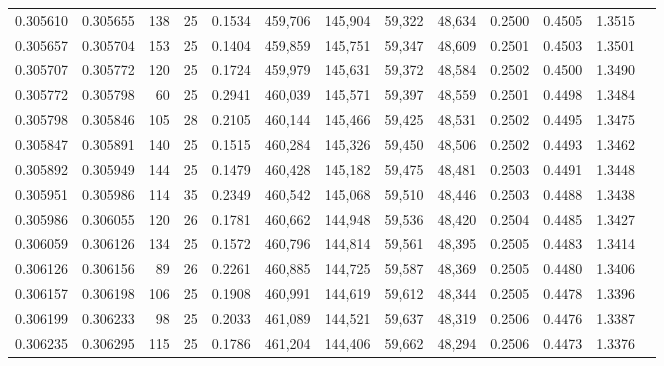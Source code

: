 \begin{tabular}{rrrrrrrrrrrrr}
0.305610 & 0.305655 &   138 &  25 &                                     0.1534 & 459,706 & 145,904 &  59,322 &  48,634 & 0.2500 & 0.4505 & 1.3515 \\
0.305657 & 0.305704 &   153 &  25 &                                     0.1404 & 459,859 & 145,751 &  59,347 &  48,609 & 0.2501 & 0.4503 & 1.3501 \\
0.305707 & 0.305772 &   120 &  25 &                                     0.1724 & 459,979 & 145,631 &  59,372 &  48,584 & 0.2502 & 0.4500 & 1.3490 \\
0.305772 & 0.305798 &    60 &  25 &                                     0.2941 & 460,039 & 145,571 &  59,397 &  48,559 & 0.2501 & 0.4498 & 1.3484 \\
0.305798 & 0.305846 &   105 &  28 &                                     0.2105 & 460,144 & 145,466 &  59,425 &  48,531 & 0.2502 & 0.4495 & 1.3475 \\
0.305847 & 0.305891 &   140 &  25 &                                     0.1515 & 460,284 & 145,326 &  59,450 &  48,506 & 0.2502 & 0.4493 & 1.3462 \\
0.305892 & 0.305949 &   144 &  25 &                                     0.1479 & 460,428 & 145,182 &  59,475 &  48,481 & 0.2503 & 0.4491 & 1.3448 \\
0.305951 & 0.305986 &   114 &  35 &                                     0.2349 & 460,542 & 145,068 &  59,510 &  48,446 & 0.2503 & 0.4488 & 1.3438 \\
0.305986 & 0.306055 &   120 &  26 &                                     0.1781 & 460,662 & 144,948 &  59,536 &  48,420 & 0.2504 & 0.4485 & 1.3427 \\
0.306059 & 0.306126 &   134 &  25 &                                     0.1572 & 460,796 & 144,814 &  59,561 &  48,395 & 0.2505 & 0.4483 & 1.3414 \\
0.306126 & 0.306156 &    89 &  26 &                                     0.2261 & 460,885 & 144,725 &  59,587 &  48,369 & 0.2505 & 0.4480 & 1.3406 \\
0.306157 & 0.306198 &   106 &  25 &                                     0.1908 & 460,991 & 144,619 &  59,612 &  48,344 & 0.2505 & 0.4478 & 1.3396 \\
0.306199 & 0.306233 &    98 &  25 &                                     0.2033 & 461,089 & 144,521 &  59,637 &  48,319 & 0.2506 & 0.4476 & 1.3387 \\
0.306235 & 0.306295 &   115 &  25 &                                     0.1786 & 461,204 & 144,406 &  59,662 &  48,294 & 0.2506 & 0.4473 & 1.3376 \\

\end{tabular}
